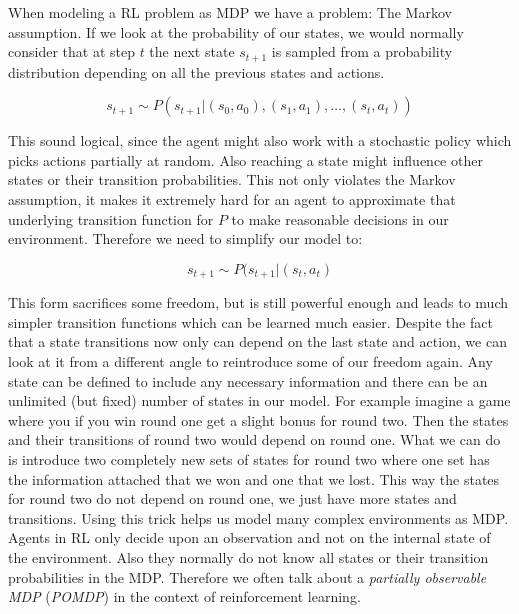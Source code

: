 When modeling a RL problem as MDP we have a problem: The Markov assumption. If we look at the probability of our states, we would normally consider that at step $t$ the next state $s_{t+1}$ is sampled from a probability distribution depending on all the previous states and actions.

\[s_{t+1} \sim P\left(s_{t+1}|(s_0, a_0), (s_1, a_1), \dots, (s_t, a_t)\right)\]

 This sound logical, since the agent might also work with a stochastic policy which picks actions partially at random. Also reaching a state might influence other states or their transition probabilities. This not only violates the Markov assumption, it makes it extremely hard for an agent to approximate that underlying transition function for $P$ to make reasonable decisions in our environment. Therefore we need to simplify our model to:  

 \[s_{t+1} \sim P(s_{t+1}|(s_t, a_t)\]

This form sacrifices some freedom, but is still powerful enough and leads to much simpler transition functions which can be learned much easier. Despite the fact that a state transitions now only can depend on the last state and action, we can look at it from a different angle to reintroduce some of our freedom again. Any state can be defined to include any necessary information and there can be an unlimited (but fixed) number of states in our model. For example imagine a game where you if you win round one get a slight bonus for round two. Then the states and their transitions of round two would depend on round one. What we can do is introduce two completely new sets of states for round two where one set has the information attached that we won and one that we lost. This way the states for round two do not depend on round one, we just have more states and transitions. Using this trick helps us model many complex environments as MDP. \\
Agents in RL only decide upon an observation and not on the internal state of the environment. Also they normally do not know all states or their transition probabilities in the MDP. Therefore we often talk about a \textit{partially observable MDP} (\textit{POMDP}) in the context of reinforcement learning.

